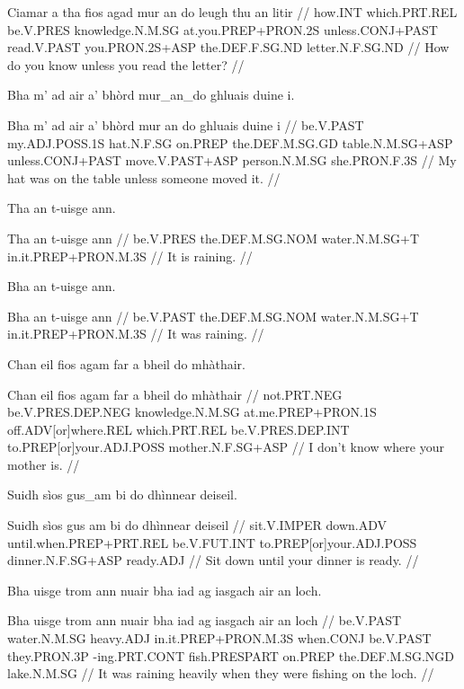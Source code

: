 \documentclass[a4paper,10pt]{article}
\begin{document}
\vspace{4mm}
\gla Ciamar a tha fios agad {mur an do} leugh thu an litir  //
\glb how.INT which.PRT.REL be.V.PRES knowledge.N.M.SG at.you.PREP+PRON.2S unless.CONJ+PAST read.V.PAST you.PRON.2S+ASP the.DEF.F.SG.ND letter.N.F.SG.ND  //
\glft How do you know unless you read the letter? //
\endgl
\xe

\ex
\begingl
\glpre Bha m' ad air a' bhòrd mur\_an\_do ghluais duine i. 

\vspace{4mm}
\gla Bha m' ad air a' bhòrd {mur an do} ghluais duine i  //
\glb be.V.PAST my.ADJ.POSS.1S hat.N.F.SG on.PREP the.DEF.M.SG.GD table.N.M.SG+ASP unless.CONJ+PAST move.V.PAST+ASP person.N.M.SG she.PRON.F.3S  //
\glft My hat was on the table unless someone moved it. //
\endgl
\xe

\ex
\begingl
\glpre Tha an t-uisge ann. 

\vspace{4mm}
\gla Tha an t-uisge ann  //
\glb be.V.PRES the.DEF.M.SG.NOM water.N.M.SG+T in.it.PREP+PRON.M.3S  //
\glft It is raining. //
\endgl
\xe

\ex
\begingl
\glpre Bha an t-uisge ann. 

\vspace{4mm}
\gla Bha an t-uisge ann  //
\glb be.V.PAST the.DEF.M.SG.NOM water.N.M.SG+T in.it.PREP+PRON.M.3S  //
\glft It was raining. //
\endgl
\xe

\ex
\begingl
\glpre Chan eil fios agam far a bheil do mhàthair. 

\vspace{4mm}
\gla Chan eil fios agam far a bheil do mhàthair  //
\glb not.PRT.NEG be.V.PRES.DEP.NEG knowledge.N.M.SG at.me.PREP+PRON.1S off.ADV[or]where.REL which.PRT.REL be.V.PRES.DEP.INT to.PREP[or]your.ADJ.POSS mother.N.F.SG+ASP  //
\glft I don't know where your mother is. //
\endgl
\xe

\ex
\begingl
\glpre Suidh sìos gus\_am bi do dhìnnear deiseil. 

\vspace{4mm}
\gla Suidh sìos {gus am} bi do dhìnnear deiseil  //
\glb sit.V.IMPER down.ADV until.when.PREP+PRT.REL be.V.FUT.INT to.PREP[or]your.ADJ.POSS dinner.N.F.SG+ASP ready.ADJ  //
\glft Sit down until your dinner is ready. //
\endgl
\xe

\ex
\begingl
\glpre Bha uisge trom ann nuair bha iad ag iasgach air an loch. 

\vspace{4mm}
\gla Bha uisge trom ann nuair bha iad ag iasgach air an loch  //
\glb be.V.PAST water.N.M.SG heavy.ADJ in.it.PREP+PRON.M.3S when.CONJ be.V.PAST they.PRON.3P -ing.PRT.CONT fish.PRESPART on.PREP the.DEF.M.SG.NGD lake.N.M.SG  //
\glft It was raining heavily when they were fishing on the loch. //
\endgl
\xe
\end{document}
